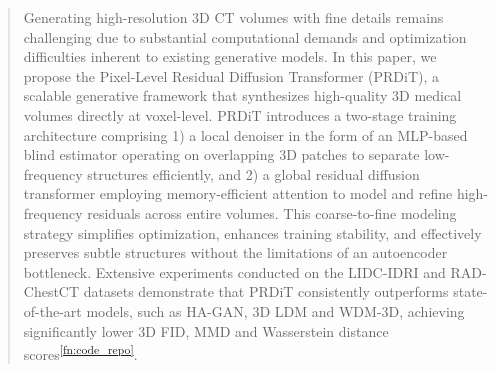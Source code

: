 \begin{abstract}
Generating high-resolution 3D CT volumes with fine details remains challenging due to substantial computational demands and optimization difficulties inherent to existing generative models. In this paper, we propose the Pixel-Level Residual Diffusion Transformer (PRDiT), a scalable generative framework that synthesizes high-quality 3D medical volumes directly at voxel-level. PRDiT introduces a two-stage training architecture comprising 1) a local denoiser in the form of an MLP-based blind estimator operating on overlapping 3D patches to separate low-frequency structures efficiently, and 2) a global residual diffusion transformer employing memory-efficient attention to model and refine high-frequency residuals across entire volumes. This coarse-to-fine modeling strategy simplifies optimization, enhances training stability, and effectively preserves subtle structures without the limitations of an autoencoder bottleneck. Extensive experiments conducted on the LIDC-IDRI and RAD-ChestCT datasets demonstrate that PRDiT consistently outperforms state-of-the-art models, such as HA-GAN, 3D LDM and WDM-3D, achieving significantly lower 3D FID, MMD and Wasserstein distance scores\textsuperscript{\ref{fn:code_repo}}.
\end{abstract}